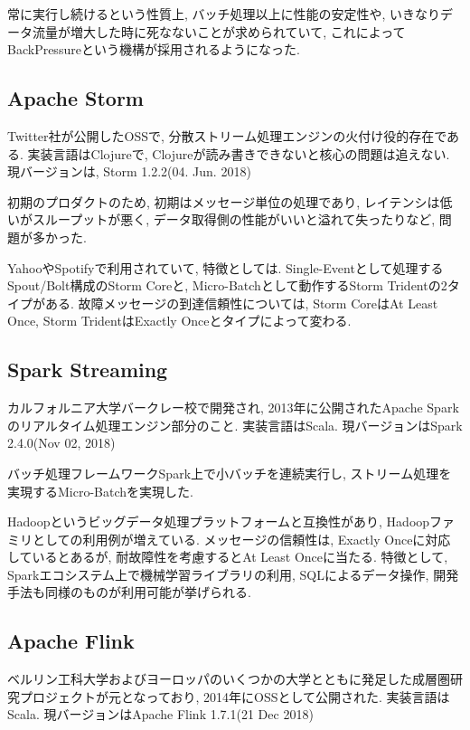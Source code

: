 \documentclass[11pt]{jreport}
\begin{document}
常に実行し続けるという性質上, バッチ処理以上に性能の安定性や, いきなりデータ流量が増大した時に死なないことが求められていて, これによってBackPressureという機構が採用されるようになった.


\subsection{Apache Storm}
Twitter社が公開したOSSで, 分散ストリーム処理エンジンの火付け役的存在である. 実装言語はClojureで, Clojureが読み書きできないと核心の問題は追えない. 現バージョンは, Storm 1.2.2(04. Jun. 2018)

初期のプロダクトのため, 初期はメッセージ単位の処理であり, レイテンシは低いがスループットが悪く, データ取得側の性能がいいと溢れて失ったりなど, 問題が多かった. \cite{qiita_stream_2}

YahooやSpotifyで利用されていて, 特徴としては. Single-Eventとして処理するSpout/Bolt構成のStorm Coreと, Micro-Batchとして動作するStorm Tridentの2タイプがある.  \cite{qiita_stream_1}
故障メッセージの到達信頼性については, Storm CoreはAt Least Once, Storm TridentはExactly Onceとタイプによって変わる. \cite{slide_flink}

\subsection{Spark Streaming}
カルフォルニア大学バークレー校で開発され, 2013年に公開されたApache Sparkのリアルタイム処理エンジン部分のこと. 実装言語はScala. 現バージョンはSpark 2.4.0(Nov 02, 2018) \cite{spark}

バッチ処理フレームワークSpark上で小バッチを連続実行し, ストリーム処理を実現するMicro-Batchを実現した. \cite{qiita_stream_2}

Hadoopというビッグデータ処理プラットフォームと互換性があり, Hadoopファミリとしての利用例が増えている. メッセージの信頼性は, Exactly Onceに対応しているとあるが, 耐故障性を考慮するとAt Least Onceに当たる.  \cite{qiita_stream_1}
特徴として, Sparkエコシステム上で機械学習ライブラリの利用, SQLによるデータ操作, 開発手法も同様のものが利用可能が挙げられる. \cite{qiita_stream_2}

\subsection{Apache Flink}
ベルリン工科大学およびヨーロッパのいくつかの大学とともに発足した成層圏研究プロジェクトが元となっており, 2014年にOSSとして公開された\cite{flink}. 実装言語はScala. 現バージョンはApache Flink 1.7.1(21 Dec 2018)
\end{document}
